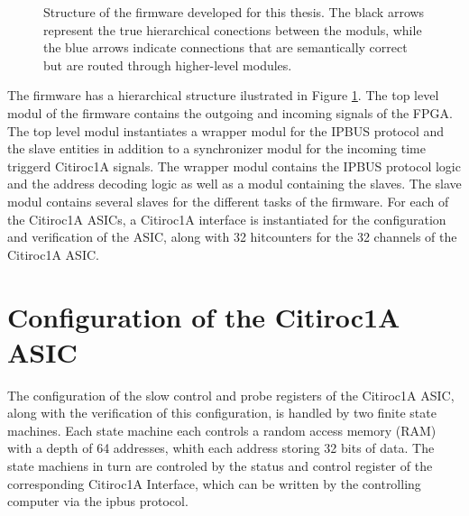 \begin{figure}[H]
\begin{tikzpicture}[node distance=2cm]
        
    \end{tikzpicture}
    \caption{Structure of the firmware developed for this thesis. The black arrows represent the true hierarchical 
    conections between the moduls, while the blue arrows indicate connections that are semantically correct but are routed through higher-level modules.}
    \label{fig:Firmware_structure}
\end{figure}
The firmware has a hierarchical structure ilustrated in Figure \ref{fig:Firmware_structure}. 
\newline
The top level modul of the firmware contains the outgoing and incoming signals of the FPGA.
\newline
The top level modul instantiates a wrapper modul for the IPBUS protocol and the slave entities in addition to a synchronizer modul for the incoming time triggerd Citiroc1A signals. 
\newline
The wrapper modul contains the IPBUS protocol logic and the address decoding logic as well as a modul containing the slaves.
\newline
The slave modul contains several slaves for the different tasks of the firmware. For each of the Citiroc1A ASICs, a Citiroc1A interface is instantiated for the configuration and verification of the ASIC, along with
32 hitcounters for the 32 channels of the Citiroc1A ASIC. 



\section{Configuration of the Citiroc1A ASIC}

The configuration of the slow control and probe registers of the Citiroc1A ASIC,
 along with the verification of this configuration, is handled by two finite state machines.
 \newline
  Each state machine each controls a random access memory (RAM) with a depth of 64 addresses,
  whith each address storing 32 bits of data.
 \newline
The state machiens in turn are controled by the status and control register of the corresponding Citiroc1A Interface, which can be written by the controlling computer via the ipbus protocol.
